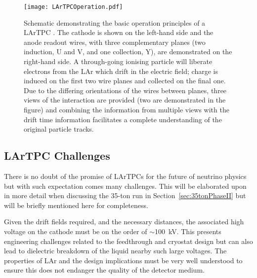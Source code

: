 \begin{figure}
  \centering
  \texttt{[image: LArTPCOperation.pdf]}
  \caption[Schematic demonstrating the basic operation principles of a LArTPC.]{Schematic demonstrating the basic operation principles of a LArTPC \cite{MicroBooNENoise2017}.  The cathode is shown on the left-hand side and the anode readout wires, with three complementary planes (two induction, U and V, and one collection, Y), are demonstrated on the right-hand side.  A through-going ionising particle will liberate electrons from the LAr which drift in the electric field; charge is induced on the first two wire planes and collected on the final one.  Due to the differing orientations of the wires between planes, three views of the interaction are provided (two are demonstrated in the figure) and combining the information from multiple views with the drift time information facilitates a complete understanding of the original particle tracks.}
  \label{fig:LArTPCOperation}
\end{figure}

\subsection{LArTPC Challenges}\label{sec:LArTPCChallenges}

There is no doubt of the promise of LArTPCs for the future of neutrino physics but with such expectation comes many challenges.  This will be elaborated upon in more detail when discussing the 35-ton run in Section~\ref{sec:35tonPhaseII} but will be briefly mentioned here for completeness.

Given the drift fields required, and the necessary distances, the associated high voltage on the cathode must be on the order of $\sim$100~kV.  This presents engineering challenges related to the feedthrough and cryostat design but can also lead to dielectric breakdown of the liquid nearby such large voltages.  The properties of LAr and the design implications must be very well understood to ensure this does not endanger the quality of the detector medium.

